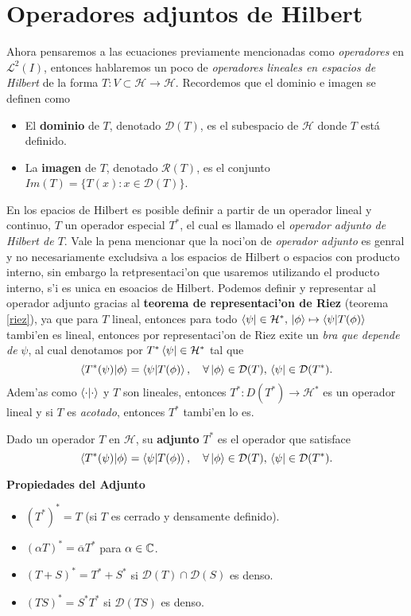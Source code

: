 \documentclass[main.tex]{subfiles}
\begin{document}
\section{Operadores adjuntos de Hilbert}
\noindent Ahora pensaremos a las ecuaciones previamente mencionadas como \emph{operadores} en \(\mathcal{L}^{2}(I)\), entonces hablaremos un poco de \emph{operadores lineales en espacios de Hilbert} de la forma $T:V\subset\mathcal{H}\to\mathcal{H}$. Recordemos que el dominio e imagen se definen como
\begin{itemize}
    \item El \textbf{dominio} de $T$, denotado $\mathcal{D}(T)$, es el subespacio de $\mathcal{H}$ donde $T$ está definido.
    \item La \textbf{imagen} de $T$, denotado $\mathcal{R}(T)$, es el conjunto $Im(T)=\{T(x) : x \in \mathcal{D}(T)\}$.
\end{itemize}
En los epacios de Hilbert es posible definir a partir de un operador lineal y continuo, \(T\) un operador especial \(T^{*}\), el cual es llamado el \emph{operador adjunto de Hilbert de \(T\)}. Vale la pena mencionar que la noci'on de \emph{operador adjunto} es genral y no necesariamente excludsiva a los espacios de Hilbert o espacios con producto interno, sin embargo la retpresentaci'on que usaremos utilizando el producto interno, s'i es unica en esoacios de Hilbert. Podemos definir y representar al operador adjunto gracias al \textbf{teorema de representaci'on de Riez} (teorema \ref{riez}), ya que para \(T\) lineal, entonces para todo \(\bra{\psi}\in\mathcal{H}^{*},\,\ket{\phi}\mapsto\braket{\psi|T(\phi)}\) tambi'en es lineal, entonces por representaci'on de Riez exite un \emph{bra que depende de} \(\psi\), al cual denotamos por \(T^{*}\bra{\psi}\in\mathcal{H}^{*}\) tal que
\[
  \braket{T^{*}(\psi)|\phi}=\braket{\psi| T(\phi)}, \quad \forall \ket{\phi} \in \mathcal{D}(T), \, \bra{\psi} \in \mathcal{D}(T^*).
\]
\noindent Adem'as como \(\braket{\cdot|\cdot}\) y \(T\) son lineales, entonces \(T^{*}:D(T^{*})\to\mathcal{H}^{*}\) es un operador lineal y si \(T\) es \emph{acotado}, entonces \(T^{*}\) tambi'en lo es.

\begin{def.}
Dado un operador $T$ en $\mathcal{H}$, su \textbf{adjunto} $T^*$ es el operador que satisface
\[
\braket{T^{*}(\psi)|\phi}=\braket{\psi| T(\phi)}, \quad \forall \ket{\phi} \in \mathcal{D}(T), \, \bra{\psi} \in \mathcal{D}(T^*).
\]
\end{def.}


\noindent\textbf{Propiedades del Adjunto}
\begin{itemize}
    \item $(T^*)^* = T$ (si $T$ es cerrado y densamente definido).
    \item $(\alpha T)^* = \overline{\alpha} T^*$ para $\alpha \in \mathbb C $.
    \item $(T + S)^* = T^* + S^*$ si $\mathcal{D}(T) \cap \mathcal{D}(S)$ es denso.
    \item $(TS)^* = S^* T^*$ si $\mathcal{D}(TS)$ es denso.
\end{itemize}
\end{document}
